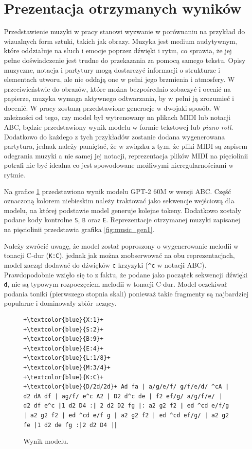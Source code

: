 \documentclass[data-science]{agh-wi} %
\begin{document}
\section{Prezentacja otrzymanych wyników}
Przedstawienie muzyki w pracy stanowi wyzwanie w porównaniu na przykład do wizualnych form sztuki, takich jak obrazy. Muzyka jest medium audytywnym, które oddziałuje na słuch i emocje poprzez dźwięki i rytm, co sprawia, że jej pełne doświadczenie jest trudne do przekazania za pomocą samego tekstu. Opisy muzyczne, notacja i partytury mogą dostarczyć informacji o strukturze i elementach utworu, ale nie oddają one w pełni jego brzmienia i atmosfery. W przeciwieństwie do obrazów, które można bezpośrednio zobaczyć i ocenić na papierze, muzyka wymaga aktywnego odtwarzania, by w pełni ją zrozumieć i docenić. W pracy zostaną przedstawione generacje w dwojaki sposób. W zależności od tego, czy model był wytrenowany na plikach MIDI lub notacji ABC, będzie przedstawiony wynik modelu w formie tekstowej lub \textit{piano roll}. Dodatkowo do każdego z tych przykładów zostanie dodana wygenerowana partytura, jednak należy pamiętać, że w związku z tym, że pliki MIDI są zapisem odegrania muzyki a nie samej jej notacji, reprezentacja plików MIDI na pięciolinii potrafi nie być idealna co jest spowodowane możliwymi nieregularnościami w rytmie.

Na grafice \ref*{code:music_gen1} przedstawiono wynik modelu GPT-2 60M w wersji ABC. Część oznaczoną kolorem niebieskim należy traktować jako sekwencje wejściową dla modelu, na której podstawie model generuje kolejne tokeny. Dodatkowo zostały podane kody kontrolne \texttt{S}, \texttt{B} oraz \texttt{E}. Reprezentacje otrzymanej muzyki zapisanej na pięciolinii przedstawia grafika \ref*{fig:music_gen1}.

Należy zwrócić uwagę, że model został poproszony o wygenerowanie melodii w tonacji C-dur (\texttt{K:C}), jednak jak można zaobserwować na obu reprezentacjach, model zaczął dodawać do dźwięków \texttt{c} krzyzyki (\texttt{\string^c} w notacji ABC). Prawdopodobnie wzięło się to z faktu, że podane jako początek sekwencji dźwięki \texttt{d}, nie są typowym rozpoczęciem melodii w tonacji C-dur. Model oczekiwał podania toniki (pierwszego stopnia skali) ponieważ takie fragmenty są najbardziej popularne i dominowały zbiór uczący.

\begin{figure}
    \begin{verbatim}
+\textcolor{blue}{X:1}+
+\textcolor{blue}{S:2}+
+\textcolor{blue}{B:9}+
+\textcolor{blue}{E:4}+
+\textcolor{blue}{L:1/8}+
+\textcolor{blue}{M:3/4}+
+\textcolor{blue}{K:C}+
+\textcolor{blue}{D/2d/2d}+ Ad fa | a/g/e/f/ g/f/e/d/ ^cA | d2 dA df | ag/f/ e^c A2 | D2 d^c de | f2 ef/g/ a/g/f/e/ | d2 df e^c |1 d2 D4 :| 2 d2 D2 fg |: a2 g2 f2 | ed ^cd e/f/g | a2 g2 f2 | ed ^cd e/f g | a2 g2 f2 | ed ^cd ef/g/ | a2 g2 fe |1 d2 de fg :|2 d2 D4 ||
    \end{verbatim}
    \caption{Wynik modelu.}\label{code:music_gen1}
\end{figure}
\end{document}
